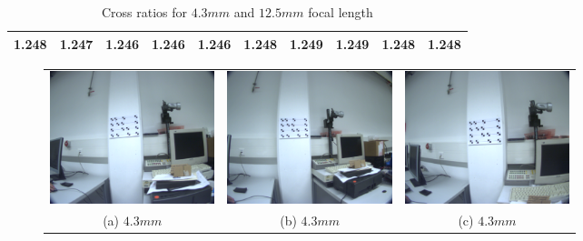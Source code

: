 \documentclass[
a4paper,     %
12pt         %
]{scrartcl}  %
\begin{document}
\begin{table}[ht!]
  \centering
  \begin{tabular}{|c|c|c|c|c||c|c|c|c|c|}\hline
    1.248 & 1.247 & 1.246 & 1.246 & 1.246 & 1.248 & 1.249 & 1.249 & 1.248 & 1.248\\\hline
  \end{tabular}
  \caption{Cross ratios for $4.3mm$ and $12.5mm$ focal length}
  \label{tab:cross_ratios}
\end{table}


\begin{figure}[ht!]
\centering
\begin{tabular}{ccc}
 \includegraphics[width=48mm]{./Bildg_Messtechnik_Lab/CrossRatio/images/image_a1.png} & \includegraphics[width=48mm]{./Bildg_Messtechnik_Lab/CrossRatio/images/image_a2.png} & \includegraphics[width=48mm]{./Bildg_Messtechnik_Lab/CrossRatio/images/image_a3.png}\\
(a) $4.3mm$ & (b) $4.3mm$ & (c) $4.3mm$\\[6pt]

\end{tabular}
\end{figure}
\end{document}
